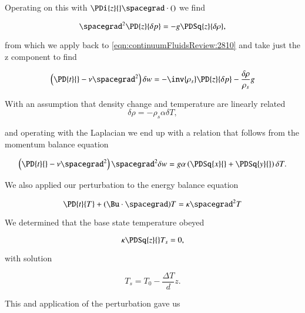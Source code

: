 Operating on this with $\PDi{z}{} \spacegrad \cdot ()$ we find

\begin{equation}\label{eqn:continuumFluidsReview:2830}
\spacegrad^2 \PD{z}{\delta p} = -g \PDSq{z}{\delta \rho},
\end{equation}

from which we apply back to \ref{eqn:continuumFluidsReview:2810} and take just the z component to find

\begin{equation}\label{eqn:continuumFluidsReview:2850}
\left( \PD{t}{} - \nu \spacegrad^2 \right) \delta w = -\inv{\rho_s} \PD{z}{\delta p} - \frac{\delta \rho}{\rho_s} g
\end{equation}

With an assumption that density change and temperature are linearly related
\begin{equation}\label{eqn:continuumFluidsReview:2870}
\delta \rho = - \rho_s \alpha \delta T,
\end{equation}

and operating with the Laplacian we end up with a relation that follows from the momentum balance equation

\begin{equation}\label{eqn:continuumFluidsReview:2890}
\left( \PD{t}{} - \nu \spacegrad^2 \right) \spacegrad^2 \delta w
=
g \alpha \left(
\PDSq{x}{}
+\PDSq{y}{}
\right)
\delta T.
\end{equation}

We also applied our perturbation to the energy balance equation

\begin{equation}\label{eqn:continuumFluidsReview:2910}
\PD{t}{T} + (\Bu \cdot \spacegrad) T = \kappa \spacegrad^2 T
\end{equation}

We determined that the base state temperature obeyed

\begin{equation}\label{eqn:continuumFluidsReview:2930}
\kappa \PDSq{z}{} T_s = 0,
\end{equation}

with solution

\begin{equation}\label{eqn:continuumFluidsReview:2950}
T_s = T_0 - \frac{\Delta T}{d} z.
\end{equation}

This and application of the perturbation gave us

